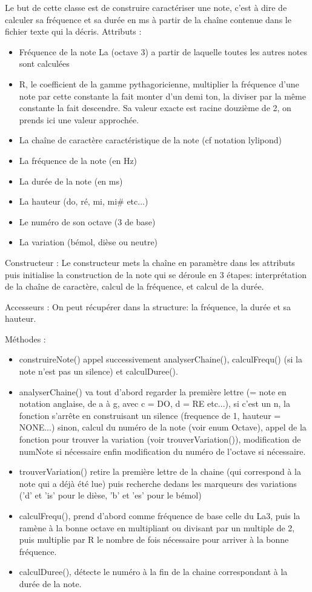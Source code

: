 \documentclass{EPUProjetPeiP}
\begin{document}
Le but de cette classe est de construire caractériser une note, c'est à dire de calculer sa fréquence et sa durée en ms à partir de la chaîne contenue dans le fichier texte qui la décris.
Attributs :
\begin{itemize}
\item Fréquence de la note La (octave 3) a partir de laquelle toutes les autres notes sont calculées
\item R, le coefficient de la gamme pythagoricienne, multiplier la fréquence d'une note par cette constante la fait monter d'un demi ton, la diviser par la même constante la fait descendre. Sa valeur exacte est racine douzième de 2, on prends ici une valeur approchée.
\item La chaîne de caractère caractéristique de la note (cf notation lylipond)
\item La fréquence de la note (en Hz)
\item La durée de la note (en ms)
\item La hauteur (do, ré, mi, mi\# etc...)
\item Le numéro de son octave (3 de base)
\item La variation (bémol, dièse ou neutre)
\end{itemize}

Constructeur :
Le constructeur mets la chaîne en paramètre dans les attributs puis initialise la construction de la note qui se déroule en 3 étapes: interprétation de la chaîne de caractère, calcul de la fréquence, et calcul de la durée.

Accesseurs :
On peut récupérer dans la structure: la fréquence, la durée et sa hauteur.

Méthodes :
\begin{itemize}
\item construireNote() appel successivement analyserChaine(), calculFrequ() (si la note n'est pas un silence) et calculDuree().
\item analyserChaine() va tout d'abord regarder la première lettre (= note en notation anglaise, de a à g, avec c = DO, d = RE etc...), si c'est un n, la fonction s'arrête en construisant un silence (frequence de 1, hauteur = NONE...) sinon, calcul du numéro de la note (voir enum Octave), appel de la fonction pour trouver la variation (voir trouverVariation()), modification de numNote si nécessaire enfin modification du numéro de l'octave si nécessaire.
\item trouverVariation() retire la première lettre de la chaine (qui correspond à la note qui a déjà été lue) puis recherche dedans les marqueurs des variations ('d' et 'is' pour le dièse, 'b' et 'es' pour le bémol)
\item calculFrequ(), prend d'abord comme fréquence de base celle du La3, puis la ramène à la bonne octave en multipliant ou divisant par un multiple de 2, puis multiplie par R le nombre de fois nécessaire pour arriver à la bonne fréquence.
\item calculDuree(), détecte le numéro à la fin de la chaine correspondant à la durée de la note.
\end{itemize}
\end{document}
